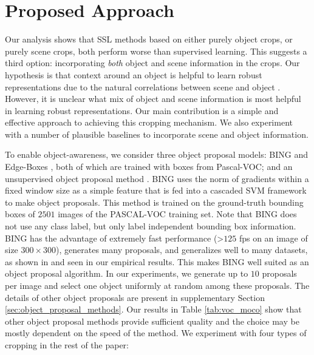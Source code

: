 \section{Proposed Approach}
\label{sec:model}

Our analysis shows that SSL methods based on either purely object crops, or purely scene crops, both perform worse than supervised learning. This suggests a third option: incorporating \emph{both} object and scene information in the crops. Our hypothesis is that context around an object is helpful to learn robust representations due to the natural correlations between scene and object \citep{Hinton2021HowTR}. However, it is unclear what mix of object and scene information is most helpful in learning robust representations. Our main contribution is a simple and effective approach to achieving this cropping mechanism. We also experiment with a number of plausible baselines to incorporate scene and object information.

To enable object-awareness, we consider three object proposal models: BING \citep{Cheng2014BINGBN} and Edge-Boxes \citep{Zitnick2014EdgeBL}, both of which are trained with boxes from Pascal-VOC; and an unsupervised object proposal method \citep{vo2019unsupervised}. BING \citep{Cheng2014BINGBN} uses the norm of gradients within a fixed window size as a simple feature that is fed into a cascaded SVM framework to make object proposals. This method is trained on the ground-truth bounding boxes of $2501$ images of the PASCAL-VOC \citep{everingham2010pascal} training set. Note that BING does not use any class label, but only label independent bounding box information. BING has the advantage of extremely fast performance (>$125$ fps on an image of size $300 \times 300$), generates many proposals, and generalizes well to many datasets, as shown in \citet{Cheng2014BINGBN} and seen in our empirical results. This makes BING well suited as an object proposal algorithm. In our experiments, we generate up to $10$ proposals per image and select one object uniformly at random among these proposals. The details of other object proposals are present in supplementary Section \ref{sec:object_proposal_methods}. Our results in Table \ref{tab:voc_moco} show that other object proposal methods provide sufficient quality and the choice may be mostly dependent on the speed of the method. We experiment with four types of cropping in the rest of the paper: 

